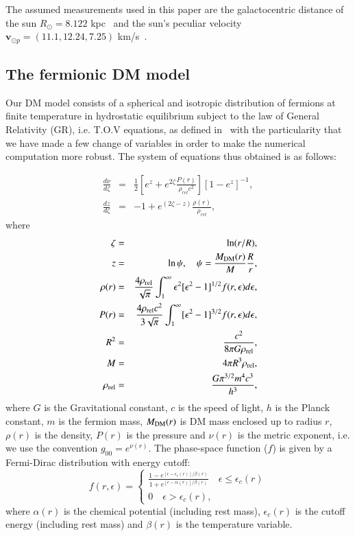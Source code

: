 \documentclass[twocolumn]{aa}
\begin{document}
The assumed measurements used in this paper are the
galactocentric distance of the sun $R_\odot=8.122$ kpc~\citep{2018A&A...615L..15G} and the sun's peculiar
velocity $\boldsymbol{v}_{\odot p} = (11.1, 12.24, 7.25)$ km/s~\citep{Shonrich}.


\subsection{The fermionic DM model}
Our DM model consists of a spherical and isotropic distribution of fermions at finite temperature in hydrostatic equilibrium subject to the law of General Relativity (GR), i.e. T.O.V equations, as defined in~\cite{arguelles_novel_2018} with the particularity that we have made a few change of variables in order to make the numerical computation more robust. The system of equations thus obtained is as follows:

\begin{eqnarray}
   \label{sode}
   \frac{d\nu}{d\zeta} & = & \frac{1}{2}\left[e^{z}+e^{2\zeta}\frac{P(r)}{\rho_{rel}c^2}\right][1-e^{z}]^{-1},\\
   \frac{dz}{d\zeta} & = &-1+e^{(2\zeta-z)}\frac{\rho(r)}{\rho_{rel}},
\end{eqnarray}
where
\begin{eqnarray}
   \zeta &=& \ln(r/R),\\
   z &=&\ln\psi,\quad \psi = \frac{M_{\rm{DM}}(r)}{M}\frac{R}{r},\label{mass_dm}\\
   \rho(r)&=&\frac{4\rho_{\rm rel}}{\sqrt{\pi}}\int^\infty_1\epsilon^2[\epsilon^2-1]^{1/2}f(r,\epsilon)d\epsilon,\\
   P(r)&=&\frac{4\rho_{\rm rel}c^2}{3\sqrt{\pi}}\int^\infty_1[\epsilon^2-1]^{3/2}f(r,\epsilon)d\epsilon,\\
   R^2 &=& \frac{c^2}{8\pi G \rho_{\rm{rel}}},\\
   M &=& 4\pi R^3 \rho_{\rm{rel}},\\
   \rho_{\rm{rel}}&=& \frac{ G\pi^{3/2} m^4 c^3}{h^3},
\end{eqnarray}
where $G$ is the Gravitational constant, $c$ is the speed of light, $h$ is the Planck constant, $m$ is the fermion mass, $M_{\rm{DM}}(r)$ is DM mass enclosed up to radius $r$, $\rho(r)$ is the density, $P(r)$ is the pressure and $\nu(r)$ is the metric exponent, i.e. we use the convention $g_{00}=e^{\nu(r)}$. The phase-space function ($f$) is given by a Fermi-Dirac distribution with energy cutoff:
\begin{equation}
f(r,\epsilon)=
   \begin{cases}
      \frac{\displaystyle{1-e^{[\epsilon-\epsilon_c(r)]/\beta(r)}}}
      {\displaystyle{1+e^{[\epsilon-\alpha(r)]/\beta(r)}}}\quad \epsilon \leq \epsilon_c(r)\\
      0\quad \epsilon > \epsilon_c(r),
   \end{cases}
\end{equation}
where $\alpha(r)$ is the chemical potential (including rest mass), $\epsilon_c(r)$ is the cutoff
energy (including rest mass) and $\beta(r)$ is the temperature variable.
\end{document}
